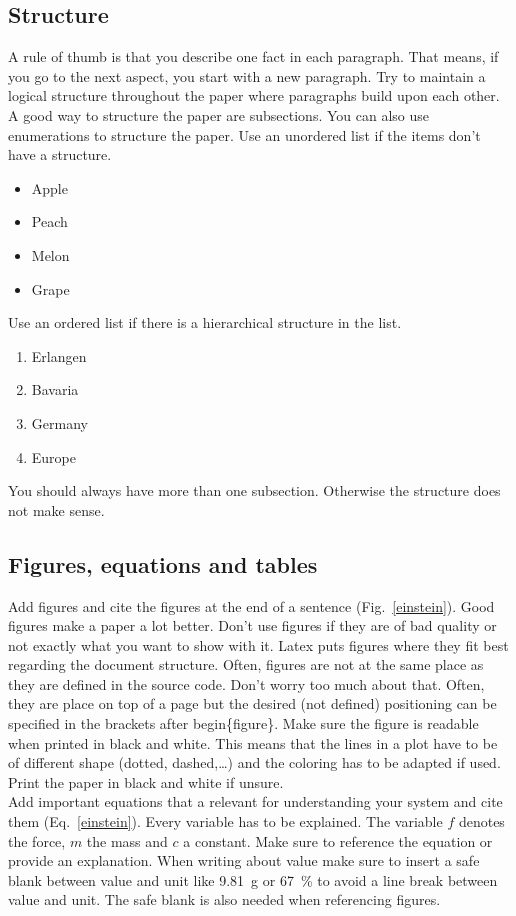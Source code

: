\subsection{Structure}
A rule of thumb is that you describe one fact in each paragraph. That means, if you go to the next aspect, you start with a new paragraph. Try to maintain a logical structure throughout the paper where paragraphs build upon each other.\\
A good way to structure the paper are subsections. You can also use enumerations to structure the paper. Use an unordered list if the items don't have a structure.
\begin{itemize}
\item Apple
\item Peach
\item Melon
\item Grape
\end{itemize}
Use an ordered list if there is a hierarchical structure in the list.
\begin{enumerate}
\item Erlangen
\item Bavaria
\item Germany
\item Europe
\end{enumerate}
You should always have more than one subsection. Otherwise the structure does not make sense.

\subsection{Figures, equations and tables}
Add figures and cite the figures at the end of a sentence (Fig.~\ref{einstein}). Good figures make a paper a lot better. Don't use figures if they are of bad quality or not exactly what you want to show with it. Latex puts figures where they fit best regarding the document structure. Often, figures are not at the same place as they are defined in the source code. Don't worry too much about that. Often, they are place on top of a page but the desired (not defined) positioning can be specified in the brackets after begin\{figure\}. Make sure the figure is readable when printed in black and white. This means that the lines in a plot have to be of different shape (dotted, dashed,\dots) and the coloring has to be adapted if used. Print the paper in black and white if unsure.\\
Add important equations that a relevant for understanding your system and cite them (Eq.~\ref{einstein}). Every variable has to be explained. The variable $f$ denotes the force, $m$ the mass and $c$ a constant. Make sure to reference the equation or provide an explanation. When writing about value make sure to insert a safe blank between value and unit like 9.81~g or 67~\% to avoid a line break between value and unit. The safe blank is also needed when referencing figures.

